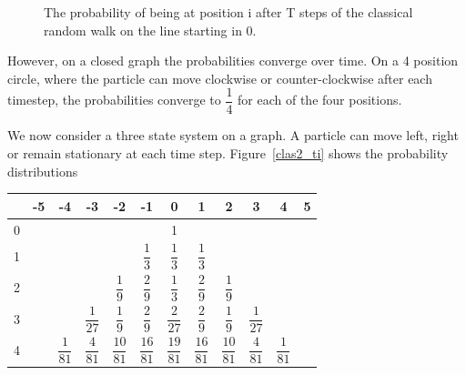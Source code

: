 \documentclass[a0,portrait]{a0poster}
\begin{document}
\begin{center}
{\begin{figure}
\caption{The probability of being at position i after T steps of the classical random walk on the line starting in 0.}
\label{clas_ti}
\end{figure}    

However, on a closed graph the probabilities converge over time. On a 4 position circle, where the particle can move clockwise or counter-clockwise after each timestep, the probabilities converge to $\dfrac{1}{4}$ for each of the four positions.

We now consider a three state system on a graph. A particle can move left, right or remain stationary at each time step. Figure~\ref{clas2_ti} shows the probability distributions 

\begin{center}
\small
\begin{tabular}{|c||c|c|c|c|c|c|c|c|c|c|c|}
\hline 
& -5 & -4 & -3 & -2 & -1 & 0 & 1 & 2 & 3 & 4 & 5 \\
\hline \hline
\hspace*{\fill} 0 \hspace*{\fill} &  &  &  &  &  & 1 &  &  &  &  & \\
\hline 
1 &  &  &  &  & 
$\dfrac{ 1 }{ 3 }$ &
$\dfrac{ 1 }{ 3 }$ &
$\dfrac{ 1 }{ 3 }$ &  &  &  & 
\hspace*{\fill} \\
\hline 
2 &  &  &  & 
$\dfrac{1}{9}$ & 
$\dfrac{ 2 }{ 9 }$ & 
$\dfrac{1}{3}$ & 
$\dfrac{ 2 }{ 9 }$ & 
$\dfrac{1}{9}$ &  &  & 
\hspace*{\fill} \\
\hline 
3 &  &  &  
$\dfrac{1}{27}$ &  
$\dfrac{ 1 }{ 9 }$ & 
$\dfrac{2}{9}$ &  
$\dfrac{ 2 }{ 27 }$ & 
$\dfrac{2}{9}$ &  
$\dfrac{ 1 }{ 9 }$ & 
$\dfrac{1}{27}$  &  & 
\hspace*{\fill} \\
\hline 
4 &  &
\hspace*{\fill} $\dfrac{1}{81}$ \hspace*{\fill} & 
$\dfrac{ 4 }{ 81 }$ & 
\hspace*{\fill} $\dfrac{10}{81}$ \hspace*{\fill} &  
$\dfrac{ 16 }{ 81 }$ & 
\hspace*{\fill} $\dfrac{19}{81}$ \hspace*{\fill} &  
$\dfrac{ 16 }{ 81 }$ & 
\hspace*{\fill} $\dfrac{10}{81}$ \hspace*{\fill} &  
$\dfrac{ 4 }{ 81 }$ & 
\hspace*{\fill} $\dfrac{1}{81}$ \hspace*{\fill} & 

\end{tabular}
\end{center}}
\end{center}
\end{document}
